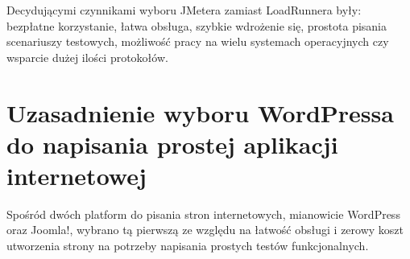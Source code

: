 Decydującymi czynnikami wyboru JMetera zamiast LoadRunnera były: bezpłatne korzystanie, łatwa obsługa, szybkie wdrożenie się, prostota pisania scenariuszy testowych, możliwość pracy na wielu systemach operacyjnych czy wsparcie dużej ilości protokołów.

\section{Uzasadnienie wyboru WordPressa do napisania prostej aplikacji internetowej}

Spośród dwóch platform do pisania stron internetowych, mianowicie WordPress oraz Joomla!, wybrano tą pierwszą ze względu na łatwość obsługi i zerowy koszt utworzenia strony na potrzeby napisania prostych testów funkcjonalnych. 

\begin{table}[H]
\caption{Zestawienie zalet i wad dwóch najpopularniejszych platform CMS}
\label{my-label3}
\end{table}
